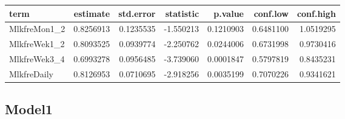 \documentclass[]{article}
\newenvironment{Shaded}{\begin{snugshade}}{\end{snugshade}}
\newcommand{\DataTypeTok}[1]{\textcolor[rgb]{0.13,0.29,0.53}{#1}}
\newcommand{\KeywordTok}[1]{\textcolor[rgb]{0.13,0.29,0.53}{\textbf{#1}}}
\newcommand{\NormalTok}[1]{#1}
\newcommand{\OperatorTok}[1]{\textcolor[rgb]{0.81,0.36,0.00}{\textbf{#1}}}
\newcommand{\OtherTok}[1]{\textcolor[rgb]{0.56,0.35,0.01}{#1}}
\newcommand{\StringTok}[1]{\textcolor[rgb]{0.31,0.60,0.02}{#1}}
\begin{document}
\begin{Shaded}
\end{Shaded}

\begin{longtable}[]{@{}lrrrrrr@{}}
\toprule
term & estimate & std.error & statistic & p.value & conf.low &
conf.high\tabularnewline
\midrule
\endhead
MlkfreMon1\_2 & 0.8256913 & 0.1235535 & -1.550213 & 0.1210903 &
0.6481100 & 1.0519295\tabularnewline
MlkfreWek1\_2 & 0.8093525 & 0.0939774 & -2.250762 & 0.0244006 &
0.6731998 & 0.9730416\tabularnewline
MlkfreWek3\_4 & 0.6993278 & 0.0956485 & -3.739060 & 0.0001847 &
0.5797819 & 0.8435231\tabularnewline
MlkfreDaily & 0.8126953 & 0.0710695 & -2.918256 & 0.0035199 & 0.7070226
& 0.9341621\tabularnewline
\bottomrule
\end{longtable}

\hypertarget{model1-1}{%
\subsection{Model1}\label{model1-1}}

\begin{Shaded}
\end{Shaded}
\end{document}
